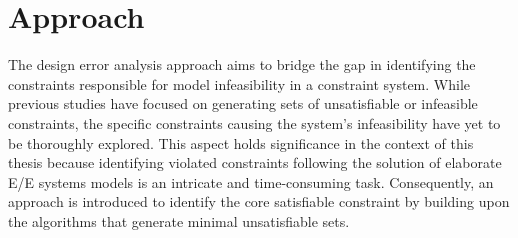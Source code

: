    
    
    
    
    
    \section{Approach}

    
    
    The design error analysis approach aims to bridge the gap in identifying the constraints responsible for model infeasibility in a constraint system. While previous studies have focused on generating sets of unsatisfiable or infeasible constraints, the specific constraints causing the system's infeasibility have yet to be thoroughly explored. This aspect holds significance in the context of this thesis because identifying violated constraints following the solution of elaborate E/E systems models is an intricate and time-consuming task. Consequently, an approach is introduced to identify the core satisfiable constraint by building upon the algorithms that generate minimal unsatisfiable sets.
    

